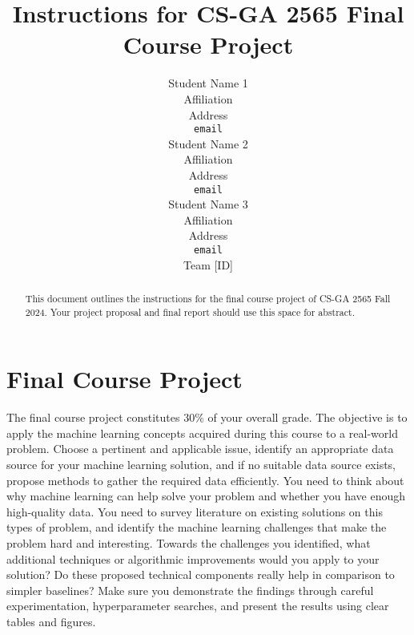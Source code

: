 \documentclass{article}
\title{Instructions for CS-GA 2565 Final Course Project}
\author{
  Student Name 1 \\
  Affiliation \\
  Address \\
  \texttt{email} \\
  \And
  Student Name 2 \\
  Affiliation \\
  Address \\
  \texttt{email} \\
  \And
  Student Name 3 \\
  Affiliation \\
  Address \\
  \texttt{email} \\
  \AND
  Team [ID] \\
}
\begin{document}
\maketitle

\begin{abstract}
  This document outlines the instructions for the final course project of CS-GA 2565 Fall 2024. Your project proposal and final report should use this space for abstract.
\end{abstract}

\section{Final Course Project}
The final course project constitutes 30\% of your overall grade. The objective is to apply the machine learning concepts acquired during this course to a real-world problem. Choose a pertinent and applicable issue, identify an appropriate data source for your machine learning solution, and if no suitable data source exists, propose methods to gather the required data efficiently. You need to think about why machine learning can help solve your problem and whether you have enough high-quality data. You need to survey literature on existing solutions on this types of problem, and identify the machine learning challenges that make the problem hard and interesting. Towards the challenges you identified, what additional techniques or algorithmic improvements would you apply to your solution? Do these proposed technical components really help in comparison to simpler baselines? Make sure you demonstrate the findings through careful experimentation, hyperparameter searches, and present the results using clear tables and figures.
\end{document}
